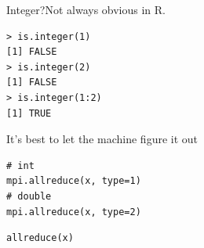\begin{frame}[fragile]
  \begin{block}{Integer?\qquad Not always obvious in R.}
    \vspace{-.2cm}
    \begin{lstlisting}
> is.integer(1)
[1] FALSE
> is.integer(2)
[1] FALSE
> is.integer(1:2)
[1] TRUE
    \end{lstlisting}
  \end{block}
  \begin{block}{It's best to let the machine figure it out}\pause
    \begin{minipage}[t]{.475\textwidth}
      \begin{lstlisting}[title=Rmpi]
# int
mpi.allreduce(x, type=1)
# double
mpi.allreduce(x, type=2)
      \end{lstlisting}
    \end{minipage}
    \hfill
    \begin{minipage}[t]{.475\textwidth}
      \begin{lstlisting}[title=pbdMPI]
allreduce(x)
      \end{lstlisting}
    \end{minipage}
  \end{block}
\end{frame}









